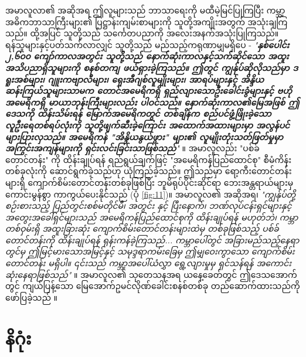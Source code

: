 \documentclass[10pt,twocolumn,letterpaper]{article}
\begin{document}
အမာလူလာ၏ အဆိုအရ ဤလူများသည် ဘာသာရေးကို မထီမဲ့မြင်ပြုကြပြီး ကမ္ဘာ့အဓိကဘာသာကြီးများ၏ ပြဋ္ဌာန်းကျမ်းစာများကို သူတို့အကျိုးအတွက် အသုံးချကြသည်။ ထို့အပြင် သူတို့သည် သင်္ကေတပညာကို အလေးအနက်အသုံးပြုကြသည်။ ရန်သူများနှင့်ပတ်သက်လာလျှင် သူတို့သည် မည်သည့်ကရုဏာမျှမရှိပေ - \textit{"\textbf{နှစ်ပေါင်း ၂,၆၀၀ ကျော်ကာလအတွင်း သူတို့သည် နောက်ဆုံးကာလနှင့်သက်ဆိုင်သော အထူးအသိပညာရှိသူများကို စနစ်တကျ ဖယ်ရှားခဲ့ကြသည်။ ဤတွင် ကျွန်ုပ်ဆိုလိုသည်မှာ ဒရူးအစ်များ၊ ဂျူးကဗျာလီများ၊ ရှေးအီဂျစ်လူမျိုးများ၊ အာရပ်များနှင့် အိန္ဒိယဆန်းကြယ်သူများသာမက တောင်အမေရိကရှိ ရှည်လျားသောဦးခေါင်းခွံများနှင့် ဗဟိုအမေရိကရှိ မာယာဘုန်းကြီးများလည်း ပါဝင်သည်။ နောက်ဆုံးကာလ၏မြေအဖြစ် ဤဒေသကို ထိန်းသိမ်းရန် မြောက်အမေရိကတွင် တစ်ချိန်က စည်ပင်ဖွံ့ဖြိုးခဲ့သော လူဦးရေတစ်ရပ်လုံးကို သူတို့ဖျက်ဆီးခဲ့ကြောင်း အထောက်အထားများမှာ အလွန်ပင်များပြားလှသည်။ အမေရိကန် "အိန္ဒိယနွယ်ဖွား" များ၏ လူမျိုးတုံးသတ်ဖြတ်မှုမှာ အကြွင်းအကျန်များကို ရှင်းလင်းခြင်းသာဖြစ်သည်}"} \cite{33,34}။
အမာလူလည်း "ပစ်ခ်တောင်တန်း" ကို ထိန်းချုပ်ရန် ရည်ရွယ်ချက်ဖြင့် "အမေရိကန်ပြည်ထောင်စု" စီမံကိန်းတစ်ခုလုံးကို ဆောင်ရွက်ခဲ့သည်ဟု ယုံကြည်ခဲ့သည်။ ဤသည်မှာ ရော့ကီးတောင်တန်းများရှိ ကျောက်စိမ်းတောင်တန်းတစ်ခုဖြစ်ပြီး ဘူမိရုပ်ပိုင်းဆိုင်ရာ ဘေးအန္တရာယ်များမှ ကောင်းမွန်စွာ ကာကွယ်ပေးနိုင်သည် (ပုံ \ref{fig:11})။ အမာလူလ၏ အဆိုအရ၊ \textit{"ကျွန်ုပ်တို့ စဉ်းစားသည့် ပြည်တွင်းစစ်မတိုင်မီ၊ အတွင်း နှင့် ပြီးနောက်၊ ဘဏ်လုပ်ငန်းရှင်များနှင့် အတွေးအခေါ်ရှင်များသည် အမေရိကန်ပြည်ထောင်စုကို ထိန်းချုပ်ရန် မဟုတ်ဘဲ၊ ကမ္ဘာတစ်ဝှမ်းရှိ အထူးခြားဆုံး ကျောက်စိမ်းတောင်တန်းများထဲမှ တစ်ခုဖြစ်သည့် ပစ်ခ်တောင်တန်းကို ထိန်းချုပ်ရန် ရုန်းကန်ခဲ့ကြသည်... ကမ္ဘာပေါ်တွင် အခြားမည်သည့်နေရာတွင်မှ ဤမြင့်မားသောအမြင့်နှင့် သမုဒ္ဒရာကမ်းခြေမှ ဤမျှဝေးကွာသော ကျောက်စိမ်းတောင်တန်း မရှိပါ။ ၎င်းသည် ကမ္ဘာ့အပေါ်ယံလွှာ ရွေ့လျားမှုမှ ရှင်သန်ရန် အကောင်းဆုံးနေရာဖြစ်သည်"} \cite{33,34}။ အမာလူလ၏ သုတေသနအရ ယနေ့ခေတ်တွင် ဤဒေသအောက်တွင် ကျယ်ပြန့်သော မြေအောက်ဥမင်လိုဏ်ခေါင်းစနစ်တစ်ခု တည်ဆောက်ထားသည်ကို ဖော်ပြခဲ့သည် \cite{36}။

\section{နိဂုံး}
\end{document}
